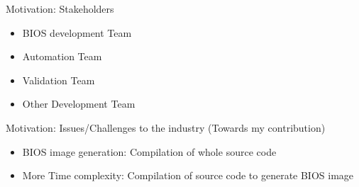 \begin{frame}{Motivation: Stakeholders}
    \begin{itemize}
        \item BIOS development Team
        \item Automation Team
        \item Validation Team
        \item Other Development Team
    \end{itemize}
\end{frame}

\begin{frame}{Motivation: Issues/Challenges to the industry (Towards my contribution)}
    \begin{itemize}
        \item BIOS image generation: Compilation of whole source code
        \item More Time complexity: Compilation of source code to generate BIOS image
    \end{itemize}
\end{frame}